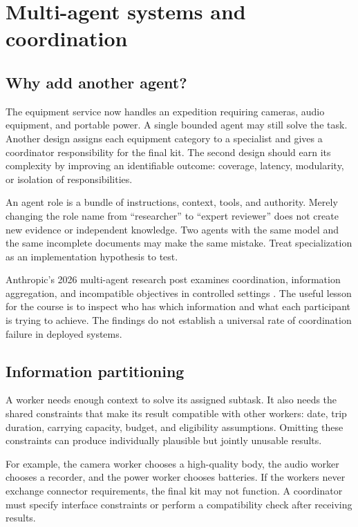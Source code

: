 \chapter{Multi-agent systems and coordination}
\section{Why add another agent?}
The equipment service now handles an expedition requiring cameras, audio equipment, and portable power. A single bounded agent may still solve the task. Another design assigns each equipment category to a specialist and gives a coordinator responsibility for the final kit. The second design should earn its complexity by improving an identifiable outcome: coverage, latency, modularity, or isolation of responsibilities.

An agent role is a bundle of instructions, context, tools, and authority. Merely changing the role name from “researcher” to “expert reviewer” does not create new evidence or independent knowledge. Two agents with the same model and the same incomplete documents may make the same mistake. Treat specialization as an implementation hypothesis to test.

Anthropic's 2026 multi-agent research post examines coordination, information aggregation, and incompatible objectives in controlled settings \cite{multiagent-report}. The useful lesson for the course is to inspect who has which information and what each participant is trying to achieve. The findings do not establish a universal rate of coordination failure in deployed systems.

\section{Information partitioning}
A worker needs enough context to solve its assigned subtask. It also needs the shared constraints that make its result compatible with other workers: date, trip duration, carrying capacity, budget, and eligibility assumptions. Omitting these constraints can produce individually plausible but jointly unusable results.

For example, the camera worker chooses a high-quality body, the audio worker chooses a recorder, and the power worker chooses batteries. If the workers never exchange connector requirements, the final kit may not function. A coordinator must specify interface constraints or perform a compatibility check after receiving results.

